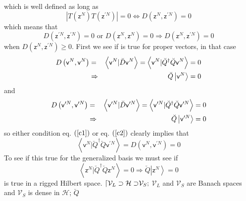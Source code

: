\documentclass[aps,preprint]{revtex4}
\begin{document}
which is well defined as long as 
\begin{equation}
\left\vert T\left( \mathsf{z}^{N}\right) T\left( \mathsf{z}^{\prime
N}\right) \right\vert =0\Longleftrightarrow D\left( \mathsf{z}^{N},\mathsf{z}%
^{\prime N}\right) =0
\end{equation}%
which means that 
\begin{equation}
D\left( \mathsf{z}^{\prime N},\mathsf{z}^{\prime N}\right) =0\text{ or }%
D\left( \mathsf{z}^{N},\mathsf{z}^{N}\right) =0\Longrightarrow D\left( 
\mathsf{z}^{N},\mathsf{z}^{\prime N}\right) =0
\end{equation}%
when $D\left( \mathsf{z}^{N},\mathsf{z}^{\prime N}\right) \geq 0$. First we
see if is true for proper vectors, in that case 
\begin{eqnarray}
D\left( \mathsf{v}^{N},\mathsf{v}^{N}\right) &=&\left\langle \mathsf{v}^{N}|%
\breve{D}\mathsf{v}^{N}\right\rangle =\left\langle \mathsf{v}^{N}|\breve{Q}%
^{\dagger }\breve{Q}\mathsf{v}^{N}\right\rangle =0  \notag \\
&\Rightarrow &\breve{Q}\left\vert \mathsf{v}^{N}\right\rangle =0  \label{c1}
\end{eqnarray}%
and 
\begin{eqnarray}
D\left( \mathsf{v}^{\prime N},\mathsf{v}^{\prime N}\right) &=&\left\langle 
\mathsf{v}^{\prime N}|\breve{D}\mathsf{v}^{\prime N}\right\rangle
=\left\langle \mathsf{v}^{\prime N}|\breve{Q}^{\dagger }\breve{Q}\mathsf{v}%
^{\prime N}\right\rangle =0  \notag \\
&\Rightarrow &\breve{Q}\left\vert \mathsf{v}^{\prime N}\right\rangle =0
\label{c2}
\end{eqnarray}%
so either condition eq. $\left( \ref{c1}\right) $ or eq. $\left( \ref{c2}%
\right) $ clearly implies that 
\begin{equation}
\left\langle \mathsf{v}^{N}|\breve{Q}^{\dagger }\breve{Q}\mathsf{v}^{\prime
N}\right\rangle =D\left( \mathsf{v}^{N},\mathsf{v}^{\prime N}\right) =0
\end{equation}%
To see if this true for the generalized basis we must see if 
\begin{equation}
\left\langle \mathsf{z}^{N}|\breve{Q}^{\dagger }\breve{Q}\mathsf{z}%
^{N}\right\rangle =0\Rightarrow \breve{Q}\left\vert \mathsf{z}%
^{N}\right\rangle =0
\end{equation}%
is true in a rigged Hilbert space. $\lceil \mathcal{V}_{L}\supset \mathcal{%
H\supset }\mathcal{V}_{S};$ $\mathcal{V}_{L}$ and $\mathcal{V}_{S}$ are
Banach spaces and $\mathcal{V}_{S}$ is dense in $\mathcal{H}$; $\breve{Q}$
\end{document}
